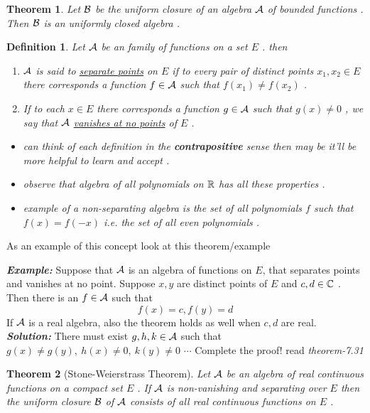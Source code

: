 \documentclass{article}
\newenvironment{simplebox}{\begin{tcolorbox}[colback=white,colframe=DarkBlue,sharp corners]\vspace{0.3cm}}{\vspace{0.3cm }
\end{tcolorbox}}
\newtheorem{theorem}{Theorem}[section]
\newtheorem{defn}{Definition}[section]
\begin{document}
\begin{theorem}\cite{rudin}
Let $\mathcal{B}$ be the uniform closure of an algebra $\mathcal{A}$ of bounded functions . Then $\mathcal{B}$ is an uniformly closed algebra .
\end{theorem}
\begin{defn}\cite{rudin}
Let $\mathcal{A}$ be an family of functions on a set $E$ . then 
\begin{enumerate}[label=(\alph*)]
    \item $\mathcal{A}$ is said to \underline{separate points} on $E$ if to every pair of distinct points $x_1,x_2 \in E$ there corresponds a function $f \in \mathcal{A}$ such that $f(x_1)\neq f(x_2)$ .
    \item  If to each $x\in  E$ there corresponds a function $g \in \mathcal{A}$ such that $g(x)\neq 0$ , we say that $\mathcal{A}$ \underline{vanishes at no points} of $E$ .
\end{enumerate}
\begin{itemize}
    \item can think of each definition in the \textbf{contrapositive} sense then may be it'll be more helpful to learn and accept .
    \item observe that algebra of all polynomials on $\mathbb{R}$ has all these properties . 
    \item example of a  non-separating algebra is the set of all polynomials $f$ such that $f(x)=f(-x)$ i.e. the set of all even polynomials .
\end{itemize}

\end{defn}
As an example of this concept look at this theorem/example 
\begin{simplebox}
\textit{\textbf{Example:}}
Suppose that $\mathcal{A}$ is an algebra of functions on $E$, that separates points and vanishes at
no point. Suppose $x, y$ are distinct points of $E$ and $c, d \in \mathbb{C}$ . Then there is an $f \in \mathcal{A}$ such that
\[f(x) = c, f(y) = d\] 
If $\mathcal{A}$ is a real algebra, also the theorem holds as well when $c, d$ are real. \\
\textbf{\textit{Solution:}}
There must exist $g, h, k \in \mathcal{A}$ such that
$g(x) \neq g(y), \ h(x) \neq 0, \ k(y) \neq 0 $ $\cdots$ Complete the proof! read \cite{rudin} \textit{theorem-7.31}
\end{simplebox}
\begin{theorem}[Stone-Weierstrass Theorem]\cite{rudin}
Let $\mathcal{A}$ be an algebra of real continuous functions on a compact set $E$ . If $\mathcal{A}$ is non-vanishing and separating over $E$ then the uniform closure $\mathcal{B}$ of $\mathcal{A}$ consists of all real continuous functions on $E$ .
\end{theorem}
\end{document}
